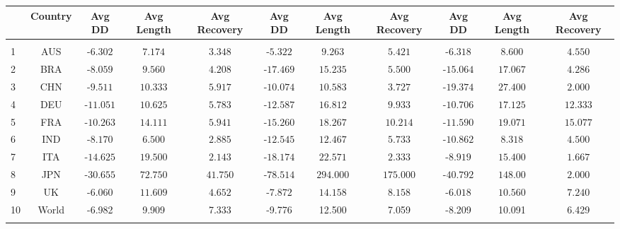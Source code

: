 \begin{table}[!htbp]
\begin{adjustbox}{width=\textwidth}
\begin{tabular}{@{\extracolsep{5pt}} Hcccccccccc}
	& Country & Avg DD & Avg Length & Avg Recovery & Avg DD & Avg Length & Avg Recovery & Avg DD & Avg Length & Avg Recovery \\ 
	\hline \\[-1.8ex] 
	1 & AUS & -$6.302$ & $7.174$ & $3.348$ & -$5.322$ & $9.263$ & $5.421$ & -$6.318$ & $8.600$ & $4.550$ \\ 
	2 & BRA & -$8.059$ & $9.560$ & $4.208$ & -$17.469$ & $15.235$ & $5.500$ & -$15.064$ & $17.067$ & $4.286$ \\ 
	3 & CHN & -$9.511$ & $10.333$ & $5.917$ & -$10.074$ & $10.583$ & $3.727$ & -$19.374$ & $27.400$ & $2.000$ \\ 
	4 & DEU & -$11.051$ & $10.625$ & $5.783$ & -$12.587$ & $16.812$ & $9.933$ & -$10.706$ & $17.125$ & $12.333$ \\ 
	5 & FRA & -$10.263$ & $14.111$ & $5.941$ & -$15.260$ & $18.267$ & $10.214$ & -$11.590$ & $19.071$ & $15.077$ \\ 
	6 & IND & -$8.170$ & $6.500$ & $2.885$ & -$12.545$ & $12.467$ & $5.733$ & -$10.862$ & $8.318$ & $4.500$ \\ 
	7 & ITA & -$14.625$ & $19.500$ & $2.143$ & -$18.174$ & $22.571$ & $2.333$ & -$8.919$ & $15.400$ & $1.667$ \\ 
	8 & JPN & -$30.655$ & $72.750$ & $41.750$ & -$78.514$ & $294.000$ & $175.000$ & -$40.792$ & $148.00$ & $2.000$ \\ 
	9 & UK & -$6.060$ & $11.609$ & $4.652$ & -$7.872$ & $14.158$ & $8.158$ & -$6.018$ & $10.560$ & $7.240$ \\ 
	10 & World & -6.982   &   9.909  &      7.333& -9.776   &    12.500    &    7.059 &-8.209&10.091 &       6.429\\
	\hline \\[-1.8ex] 
\end{tabular}
	\end{adjustbox} 
\end{table} 